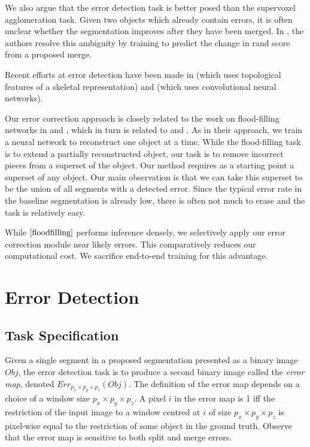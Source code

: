\documentclass{article}
\begin{document}
We also argue that the error detection task is better posed than the supervoxel agglomeration task. Given two objects which already contain errors, it is often unclear whether the segmentation improves after they have been merged. In \cite{lash}, the authors resolve this ambiguity by training to predict the change in rand score from a proposed merge.

Recent efforts at error detection have been made in \cite{multipass} (which uses topological features of a skeletal representation) and \cite{mergenet} (which uses convolutional neural networks).

Our error correction approach is closely related to the work on flood-filling networks in \cite{floodfilling} and \cite{multipass}, which in turn is related to \cite{recurrent_instance_seg_1} and \cite{recurrent_instance_seg_2}. As in their approach, we train a neural network to reconstruct one object at a time. While the flood-filling task is to extend a partially reconstructed object, our task is to remove incorrect pieces from a superset of the object. Our method requires as a starting point a superset of any object. Our main observation is that we can take this superset to be the union of all segments with a detected error. Since the typical error rate in the baseline segmentation is already low, there is often not much to erase and the task is relatively easy.

While $\cite{floodfilling}$ performs inference densely, we selectively apply our error correction module near likely errors. This comparatively reduces our computational cost. We sacrifice end-to-end training for this advantage.


\section{Error Detection}
\subsection{Task Specification}
Given a single segment in a proposed segmentation presented as a binary image $Obj$, the error detection task is to produce a second binary image called the \textit{error map}, denoted $Err_{p_x\times p_y \times p_z}(Obj)$. The definition of the error map depends on a choice of a window size $p_x \times p_y \times p_z$. A pixel $i$ in the error map is 1 iff the restriction of the input image to a window centred at $i$ of size $p_x \times p_y \times p_z$ is pixel-wise equal to the restriction of some object in the ground truth. Observe that the error map is sensitive to both split and merge errors.
\end{document}
